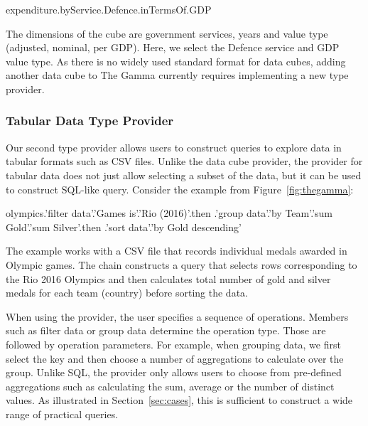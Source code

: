 \documentclass[manuscript,review,anonymous]{acmart}
\newcommand{\ikvd}[1]{{\fontfamily{zi4}\selectfont\small #1}}
\begin{document}
\begin{thegamma}
expenditure.byService.Defence.inTermsOf.GDP
\end{thegamma}

\noindent
The dimensions of the cube are government services, years and value type (adjusted, nominal,
per GDP). Here, we select the \ikvd{Defence} service and \ikvd{GDP} value type.
As there is no widely used standard format for data cubes, adding another data cube to The Gamma
currently requires implementing a new type provider.

\subsubsection*{Tabular Data Type Provider}

Our second type provider allows users to construct queries to explore data in tabular formats
such as CSV files. Unlike the data cube provider, the provider for tabular data does not just
allow selecting a subset of the data, but it can be used to construct SQL-like query. Consider
the example from Figure~\ref{fig:thegamma}:

\begin{thegamma}
olympics.'filter data'.'Games is'.'Rio (2016)'.then
  .'group data'.'by Team'.'sum Gold'.'sum Silver'.then
  .'sort data'.'by Gold descending'
\end{thegamma}

\noindent
The example works with a CSV file that records individual medals awarded in Olympic games.
The chain constructs a query that selects rows corresponding to the Rio 2016 Olympics and then
calculates total number of gold and silver medals for each team (country) before sorting the data.

When using the provider, the user specifies a sequence of operations. Members such as
\ikvd{\textquotesingle filter data\textquotesingle} or \ikvd{\textquotesingle group data\textquotesingle}
determine the operation type. Those are followed by operation parameters. For example, when grouping
data, we first select the key and then choose a number of aggregations to calculate over the group.
Unlike SQL, the provider only allows users to choose from pre-defined aggregations such as
calculating the sum, average or the number of distinct values. As illustrated in
Section~\ref{sec:cases}, this is sufficient to construct a wide range of practical queries.
\end{document}
